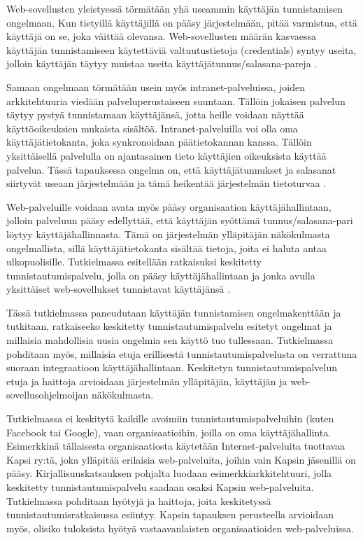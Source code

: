 Web-sovellusten yleistyessä törmätään yhä useammin käyttäjän tunnistamisen ongelmaan. Kun tietyillä käyttäjillä on pääsy järjestelmään, pitää varmistua, että käyttäjä on se, joka väittää olevansa. Web-sovellusten määrän kasvaessa käyttäjän tunnistamiseen käytettäviä valtuutustietoja (credentials) syntyy useita, jolloin käyttäjän täytyy muistaa useita käyttäjätunnus/salasana-pareja \cite{billion_keys}.

Samaan ongelmaan törmätään usein myös intranet-palveluissa, joiden arkkitehtuuria viedään palveluperustaiseen suuntaan. Tällöin jokaisen palvelun täytyy pystyä tunnistamaan käyttäjänsä, jotta heille voidaan näyttää käyttöoikeuksien mukaista sisältöä. Intranet-palveluilla voi olla oma käyttäjätietokanta, joka synkronoidaan päätietokannan kanssa. Tällöin yksittäisellä palvelulla on ajantasainen tieto käyttäjien oikeuksista käyttää palvelua. Tässä tapauksessa ongelma on, että käyttäjätunnukset ja salasanat siirtyvät useaan järjestelmään ja tämä heikentää järjestelmän tietoturvaa \cite{nisti}.

Web-palveluille voidaan avata myös pääsy organisaation käyttäjähallintaan, jolloin palveluun pääsy edellyttää, että käyttäjän syöttämä tunnus/salasana-pari löytyy käyttäjähallinnasta. Tämä on järjestelmän ylläpitäjän näkökulmasta ongelmallista, sillä käyttäjätietokanta sisältää tietoja, joita ei haluta antaa ulkopuolisille. Tutkielmassa esitellään ratkaisuksi keskitetty tunnistautumispalvelu, jolla on pääsy käyttäjähallintaan ja jonka avulla yksittäiset web-sovellukset tunnistavat käyttäjänsä \cite{nisti}.

Tässä tutkielmassa paneudutaan käyttäjän tunnistamisen ongelmakenttään ja tutkitaan, ratkaiseeko keskitetty tunnistautumispalvelu esitetyt ongelmat ja millaisia mahdollisia uusia ongelmia sen käyttö tuo tullessaan. Tutkielmassa pohditaan myös, millaisia etuja erillisestä tunnistautumispalvelusta on verrattuna suoraan integraatioon käyttäjähallintaan. Keskitetyn tunnistautumispalvelun etuja ja haittoja arvioidaan järjestelmän ylläpitäjän, käyttäjän ja web-sovellusohjelmoijan näkökulmasta.

Tutkielmassa ei keskitytä kaikille avoimiin tunnistautumispalveluihin (kuten Facebook tai Google), vaan organisaatioihin, joilla on oma käyttäjähallinta. Esimerkkinä tällaisesta organisaatiosta käytetään Internet-palveluita tuottavaa Kapsi ry:tä, joka ylläpitää erilaisia web-palveluita, joihin vain Kapsin jäsenillä on pääsy. Kirjallisuuskatsauksen pohjalta luodaan esimerkkiarkkitehtuuri, jolla keskitetty tunnistautumispalvelu saadaan osaksi Kapsin web-palveluita. Tutkielmassa pohditaan hyötyjä ja haittoja, joita keskitetyssä tunnistautumisratkaisussa  esiintyy. Kapsin tapauksen perusteella arvioidaan myös, olisiko tuloksista hyötyä vastaavanlaisten organisaatioiden web-palveluissa.

